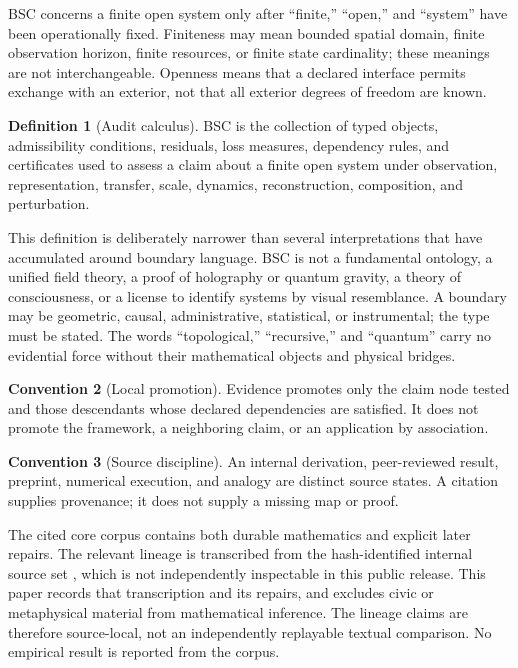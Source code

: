 \documentclass[11pt,a4paper]{article}
\theoremstyle{definition}
\newtheorem{definition}{Definition}[section]
\newtheorem{convention}[definition]{Convention}
\theoremstyle{plain}
\theoremstyle{remark}
\begin{document}
BSC concerns a finite open system only after ``finite,'' ``open,'' and
``system'' have been operationally fixed.  Finiteness may mean bounded spatial
domain, finite observation horizon, finite resources, or finite state
cardinality; these meanings are not interchangeable.  Openness means that a
declared interface permits exchange with an exterior, not that all exterior
degrees of freedom are known.

\begin{definition}[Audit calculus]\label{def:audit}
BSC is the collection of typed objects, admissibility conditions, residuals,
loss measures, dependency rules, and certificates used to assess a claim about
a finite open system under observation, representation, transfer, scale,
dynamics, reconstruction, composition, and perturbation.
\end{definition}

This definition is deliberately narrower than several interpretations that
have accumulated around boundary language.  BSC is not a fundamental ontology,
a unified field theory, a proof of holography or quantum gravity, a theory of
consciousness, or a license to identify systems by visual resemblance.  A
boundary may be geometric, causal, administrative, statistical, or
instrumental; the type must be stated.  The words ``topological,'' ``recursive,''
and ``quantum'' carry no evidential force without their mathematical objects
and physical bridges.

\begin{convention}[Local promotion]\label{conv:localpromotion}
Evidence promotes only the claim node tested and those descendants whose
declared dependencies are satisfied.  It does not promote the framework, a
neighboring claim, or an application by association.
\end{convention}

\begin{convention}[Source discipline]\label{conv:source}
An internal derivation, peer-reviewed result, preprint, numerical execution,
and analogy are distinct source states.  A citation supplies provenance; it
does not supply a missing map or proof.
\end{convention}

The cited core corpus contains both durable mathematics and explicit later
repairs.  The relevant lineage is transcribed from the hash-identified
internal source set \citep{BSCvol1,BSCvol2,BSCvol3,BSCsecond}, which is not
independently inspectable in this public release.  This paper records that
transcription and its repairs, and excludes civic or metaphysical material
from mathematical inference.  The lineage claims are therefore source-local,
not an independently replayable textual comparison.  No empirical result is
reported from the corpus.
\end{document}
